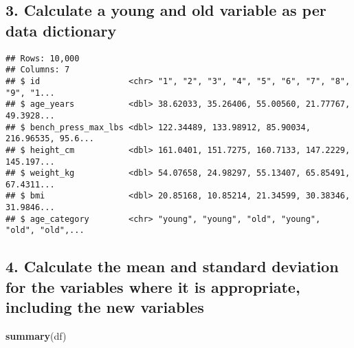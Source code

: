 \documentclass[
]{article}
\newenvironment{Shaded}{\begin{snugshade}}{\end{snugshade}}
\newcommand{\DataTypeTok}[1]{\textcolor[rgb]{0.13,0.29,0.53}{#1}}
\newcommand{\DecValTok}[1]{\textcolor[rgb]{0.00,0.00,0.81}{#1}}
\newcommand{\KeywordTok}[1]{\textcolor[rgb]{0.13,0.29,0.53}{\textbf{#1}}}
\newcommand{\NormalTok}[1]{#1}
\newcommand{\OperatorTok}[1]{\textcolor[rgb]{0.81,0.36,0.00}{\textbf{#1}}}
\newcommand{\StringTok}[1]{\textcolor[rgb]{0.31,0.60,0.02}{#1}}
\begin{document}
\hypertarget{calculate-a-young-and-old-variable-as-per-data-dictionary}{%
\subsection{3. Calculate a young and old variable as per data
dictionary}\label{calculate-a-young-and-old-variable-as-per-data-dictionary}}

\begin{Shaded}
\end{Shaded}

\begin{verbatim}
## Rows: 10,000
## Columns: 7
## $ id                  <chr> "1", "2", "3", "4", "5", "6", "7", "8", "9", "1...
## $ age_years           <dbl> 38.62033, 35.26406, 55.00560, 21.77767, 49.3928...
## $ bench_press_max_lbs <dbl> 122.34489, 133.98912, 85.90034, 216.96535, 95.6...
## $ height_cm           <dbl> 161.0401, 151.7275, 160.7133, 147.2229, 145.197...
## $ weight_kg           <dbl> 54.07658, 24.98297, 55.13407, 65.85491, 67.4311...
## $ bmi                 <dbl> 20.85168, 10.85214, 21.34599, 30.38346, 31.9846...
## $ age_category        <chr> "young", "young", "old", "young", "old", "old",...
\end{verbatim}

\hypertarget{calculate-the-mean-and-standard-deviation-for-the-variables-where-it-is-appropriate-including-the-new-variables}{%
\subsection{4. Calculate the mean and standard deviation for the
variables where it is appropriate, including the new
variables}\label{calculate-the-mean-and-standard-deviation-for-the-variables-where-it-is-appropriate-including-the-new-variables}}

\begin{Shaded}
\begin{Highlighting}[]
\KeywordTok{summary}\NormalTok{(df)}
\end{Highlighting}
\end{Shaded}
\end{document}
